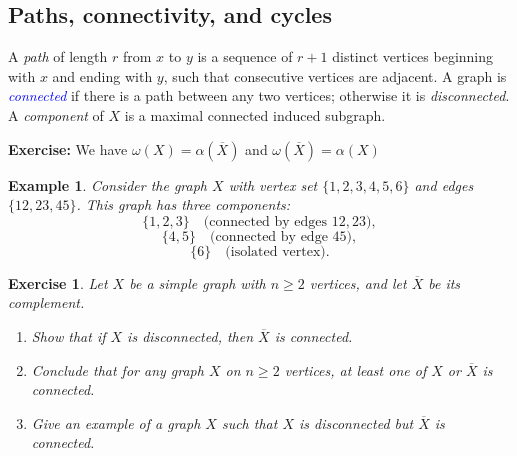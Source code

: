 \documentclass[12pt,a4paper,openany]{book}
\newtheorem{example}{Example}[section]
\newtheorem{exercise}{Exercise}[section]
\begin{document}
\subsection*{Paths, connectivity, and cycles}
A \emph{path} of length $r$ from $x$ to $y$ is a sequence of $r+1$ distinct vertices beginning with $x$ and ending with $y$, such that consecutive vertices are adjacent.  
A graph is \textcolor{blue}{\emph{connected}} if there is a path between any two vertices; otherwise it is \emph{disconnected}.  
A \emph{component} of $X$ is a maximal connected induced subgraph.
\bigskip

\noindent\textbf{Exercise:} We have $\omega(X)=\alpha(\overline{X})$ and $\omega(\overline{X})=\alpha(X)$


\begin{example}
Consider the graph $X$ with vertex set $\{1,2,3,4,5,6\}$ and edges $\{12,23,45\}$.  
This graph has three components:
\[
\{1,2,3\} \quad \text{(connected by edges }12, 23\text{)},
\]
\[
\{4,5\} \quad \text{(connected by edge }45\text{)},
\]
\[
\{6\} \quad \text{(isolated vertex)}.
\]
\end{example}

\begin{center}
\end{center}

\bigskip
\begin{exercise}
Let $X$ be a simple graph with $n \ge 2$ vertices, and let $\overline{X}$ be its complement.

\begin{enumerate}
    \item Show that if $X$ is disconnected, then $\overline{X}$ is connected.
    \item Conclude that for any graph $X$ on $n \ge 2$ vertices, at least one of $X$ or $\overline{X}$ is connected.
    \item Give an example of a graph $X$ such that $X$ is disconnected but $\overline{X}$ is connected.
\end{enumerate}

\end{exercise}
\end{document}
